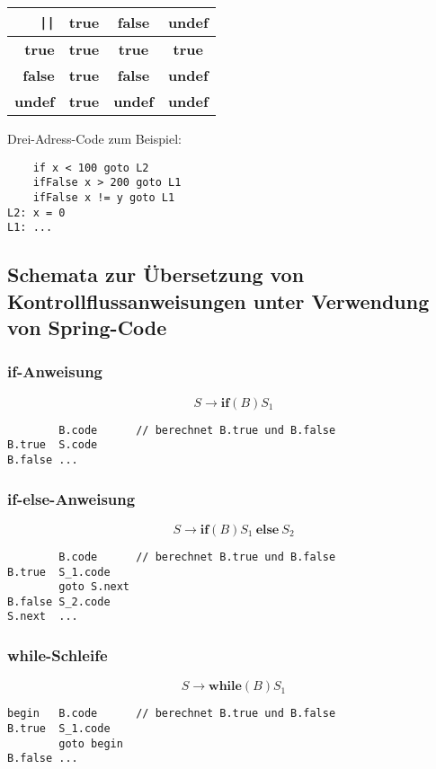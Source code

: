 \begin{itemize}
\begin{itemize}
\begin{center}
\begin{tabular}{r|c|c|c}
        \texttt{||}    & \textbf{true} & \textbf{false} & \textbf{undef} \\\hline\hline
        \textbf{true}  & \textbf{true} & \textbf{true}  & \textbf{true}  \\\hline
        \textbf{false} & \textbf{true} & \textbf{false} & \textbf{undef} \\\hline
        \textbf{undef} & \textbf{true} & \textbf{undef} & \textbf{undef} \\
       \end{tabular}
      \end{center}
     \end{itemize}
    Drei-Adress-Code zum Beispiel:
    \begin{verbatim}
    if x < 100 goto L2
    ifFalse x > 200 goto L1
    ifFalse x != y goto L1
L2: x = 0
L1: ...
    \end{verbatim}
\end{itemize}
\subsection{Schemata zur Übersetzung von Kontrollflussanweisungen unter Verwendung von Spring-Code}
\subsubsection{if-Anweisung}
\[S \to \textbf{if} (B) S_1\]
\begin{verbatim}
        B.code      // berechnet B.true und B.false
B.true  S.code
B.false ...
\end{verbatim}

\subsubsection{if-else-Anweisung}
\[S \to \textbf{if} (B) S_1\ \textbf{else}\ S_2\]
\begin{verbatim}
        B.code      // berechnet B.true und B.false
B.true  S_1.code
        goto S.next
B.false S_2.code
S.next  ...
\end{verbatim}

\subsubsection{while-Schleife}
\[S \to \textbf{while} (B) S_1\]
\begin{verbatim}
begin   B.code      // berechnet B.true und B.false
B.true  S_1.code
        goto begin
B.false ...
\end{verbatim}

